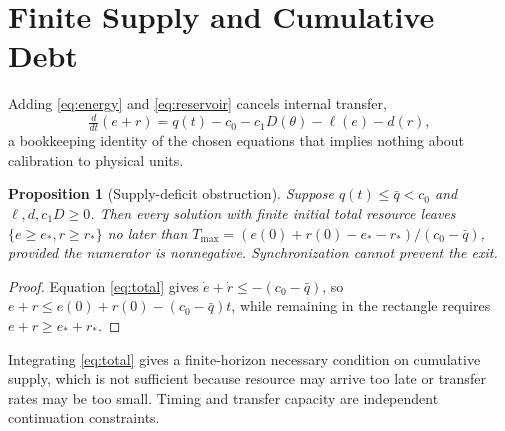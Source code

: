 \documentclass[11pt,notitlepage]{report}
\newtheorem{proposition}[theorem]{Proposition}
\theoremstyle{definition}
\theoremstyle{remark}
\begin{document}
\section{Finite Supply and Cumulative Debt}
Adding \eqref{eq:energy} and \eqref{eq:reservoir} cancels internal transfer,
\begin{equation}\label{eq:total}
\tfrac{d}{dt}(e+r)=q(t)-c_0-c_1D(\theta)-\ell(e)-d(r),
\end{equation}
a bookkeeping identity of the chosen equations that implies nothing about calibration to physical units.
\begin{proposition}[Supply-deficit obstruction]\label{prop:deficit}
Suppose $q(t)\le\bar q<c_0$ and $\ell,d,c_1D\ge0$. Then every solution with finite initial total resource leaves $\{e\ge e_*,r\ge r_*\}$ no later than $T_{\max}=(e(0)+r(0)-e_*-r_*)/(c_0-\bar q)$, provided the numerator is nonnegative. Synchronization cannot prevent the exit.
\end{proposition}
\begin{proof}
Equation \eqref{eq:total} gives $\dot e+\dot r\le-(c_0-\bar q)$, so $e+r\le e(0)+r(0)-(c_0-\bar q)t$, while remaining in the rectangle requires $e+r\ge e_*+r_*$.
\end{proof}
Integrating \eqref{eq:total} gives a finite-horizon necessary condition on cumulative supply, which is not sufficient because resource may arrive too late or transfer rates may be too small. Timing and transfer capacity are independent continuation constraints.
\end{document}
